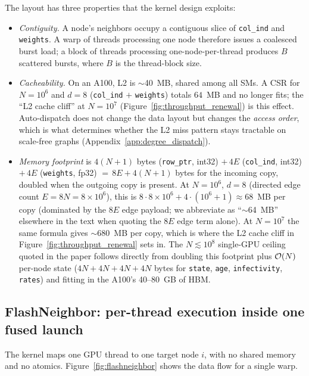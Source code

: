 The layout has three properties that the kernel design exploits:
\begin{itemize}
\item \emph{Contiguity.} A node's neighbors occupy a contiguous slice of \texttt{col\_ind} and \texttt{weights}. A warp of threads processing one node therefore issues a coalesced burst load; a block of threads processing one-node-per-thread produces $B$ scattered bursts, where $B$ is the thread-block size.
\item \emph{Cacheability.} On an A100, L2 is $\sim$40~MB, shared among all SMs. A CSR for $N = 10^6$ and $d = 8$ (\texttt{col\_ind} $+$ \texttt{weights}) totals $64$~MB and no longer fits; the ``L2 cache cliff'' at $N = 10^7$ (Figure~\ref{fig:throughput_renewal}) is this effect. Auto-dispatch does not change the data layout but changes the \emph{access order}, which is what determines whether the L2 miss pattern stays tractable on scale-free graphs (Appendix~\ref{app:degree_dispatch}).
\item \emph{Memory footprint} is $4(N{+}1)$ bytes (\texttt{row\_ptr}, int32) $+\,4E$ (\texttt{col\_ind}, int32) $+\,4E$ (\texttt{weights}, fp32) $=\,8E + 4(N{+}1)$ bytes for the incoming copy, doubled when the outgoing copy is present. At $N = 10^6$, $d = 8$ (directed edge count $E = 8N = 8 \times 10^6$), this is $8 \cdot 8 \times 10^6 + 4 \cdot (10^6{+}1) \approx 68$~MB per copy (dominated by the $8E$ edge payload; we abbreviate as ``$\sim$64~MB'' elsewhere in the text when quoting the $8E$ edge term alone). At $N = 10^7$ the same formula gives $\sim$680~MB per copy, which is where the L2 cache cliff in Figure~\ref{fig:throughput_renewal} sets in. The $N \lesssim 10^8$ single-GPU ceiling quoted in the paper follows directly from doubling this footprint plus $\mathcal{O}(N)$ per-node state ($4N + 4N + 4N + 4N$ bytes for \texttt{state}, \texttt{age}, \texttt{infectivity}, \texttt{rates}) and fitting in the A100's 40--80~GB of HBM.
\end{itemize}

\subsection{FlashNeighbor: per-thread execution inside one fused launch}
\label{app:flashneighbor}

The kernel maps one GPU thread to one target node $i$, with no shared memory and no atomics. Figure~\ref{fig:flashneighbor} shows the data flow for a single warp.

